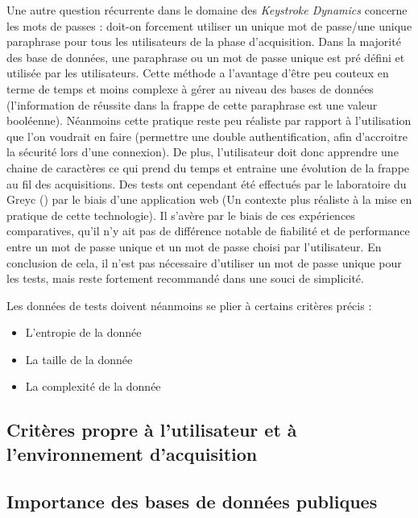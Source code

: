 Une autre question récurrente dans le domaine des \textit{Keystroke Dynamics} concerne les mots de passes : doit-on forcement utiliser un unique mot de passe/une unique paraphrase pour tous les utilisateurs de la phase d'acquisition. Dans la majorité des base de données, une paraphrase ou un mot de passe unique est pré défini et utilisée par les utilisateurs. Cette méthode a l'avantage d'être peu couteux en terme de temps et moins complexe à gérer au niveau des bases de données (l'information de réussite dans la frappe de cette paraphrase est une valeur booléenne). Néanmoins cette pratique reste peu réaliste par rapport à l'utilisation que l'on voudrait en faire (permettre une double authentification, afin d'accroitre la sécurité lors d'une connexion). De plus, l'utilisateur doit donc apprendre une chaine de caractères ce qui prend du temps et entraine une évolution de la frappe au fil des acquisitions.
Des tests ont cependant été effectués par le laboratoire du Greyc (\cite{giotWeb}) par le biais d'une application web (Un contexte plus réaliste à la mise en pratique de cette technologie). Il s'avère par le biais de ces expériences comparatives, qu'il n'y ait pas de différence notable de fiabilité et de performance entre un mot de passe unique et un mot de passe choisi par l'utilisateur.
En conclusion de cela, il n'est pas nécessaire d'utiliser un mot de passe unique pour les tests, mais reste fortement recommandé dans une souci de simplicité.

Les données de tests doivent néanmoins se plier à certains critères précis :

\begin{itemize}
	\item L'entropie de la donnée
	\item La taille de la donnée
	\item La complexité de la donnée
\end{itemize}

\subsection{Critères propre à l'utilisateur et à l'environnement d'acquisition}



\subsection{Importance des bases de données publiques}
